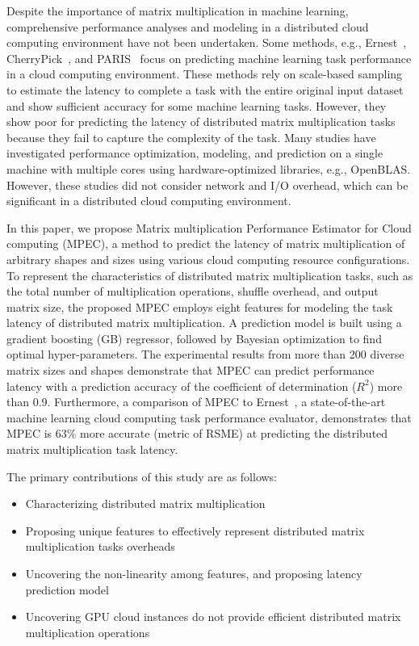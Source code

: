 \documentclass[10pt, conference, compsocconf]{IEEEtran}
\begin{document}
Despite the importance of matrix multiplication in machine learning, comprehensive performance analyses and modeling in a distributed cloud computing environment have not been undertaken. Some methods, e.g., Ernest~\cite{ernest}, CherryPick~\cite{cherrypick}, and PARIS~\cite{paris}  focus on predicting machine learning task performance in a cloud computing environment. These methods rely on scale-based sampling to estimate the latency to complete a task with the entire original input dataset and show sufficient accuracy for some machine learning tasks. However, they show poor for predicting the latency of distributed matrix multiplication tasks because they fail to capture the complexity of the task. Many studies have investigated performance optimization, modeling, and prediction on a single machine with multiple cores using hardware-optimized libraries, e.g., OpenBLAS. However, these studies did not consider network and I/O overhead, which can be significant in a distributed cloud computing environment.

In this paper, we propose Matrix multiplication Performance Estimator for Cloud computing (MPEC), a method to predict the latency of matrix multiplication of arbitrary shapes and sizes using various cloud computing resource configurations. To represent the characteristics of distributed matrix multiplication tasks, such as the total number of multiplication operations, shuffle overhead, and output matrix size, the proposed MPEC employs eight features for modeling the task latency of distributed matrix multiplication. A prediction model is built using a gradient boosting (GB) regressor, followed by Bayesian optimization to find optimal hyper-parameters. The experimental results from more than 200 diverse matrix sizes and shapes demonstrate that MPEC can predict performance latency with a prediction accuracy of the coefficient of determination ($R^2$) more than 0.9. Furthermore, a comparison of MPEC to Ernest~\cite{ernest}, a state-of-the-art machine learning cloud computing task performance evaluator, demonstrates that MPEC is 63\% more accurate (metric of RSME) at predicting the distributed matrix multiplication task latency.

The primary contributions of this study are as follows:
\begin{itemize}
  \item{Characterizing distributed matrix multiplication}
  \item{Proposing unique features to effectively represent distributed matrix multiplication tasks overheads}
  \item{Uncovering the non-linearity among features, and proposing latency prediction model}
  \item{Uncovering GPU cloud instances do not provide efficient distributed matrix multiplication operations}
\end{itemize}
\end{document}
